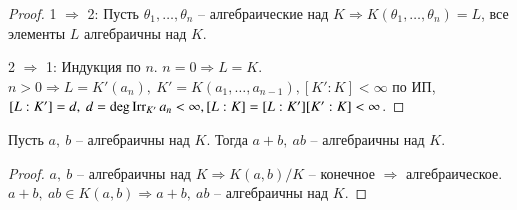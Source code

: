 \documentclass[main]{subfiles}
\begin{document}
\begin{proof}
    1 $\Rightarrow$ 2: Пусть $\theta_1, \ldots, \theta_n$ -- алгебраические над $K \Rightarrow
    K(\theta_1, \ldots, \theta_n) = L$, все элементы $L$ алгебраичны над $K$.

    2 $\Rightarrow$ 1: Индукция по $n$. $n = 0 \Rightarrow L = K$.
    $n > 0 \Rightarrow L = K'(a_n), \ K' = K(a_1, \ldots, a_{n-1}),
    [K':K] < \infty$ по ИП, $[L:K'] = d, \ d = \deg \operatorname{Irr}_{K'}a_n < \infty, 
    [L:K] = [L:K'][K':K] < \infty$.
\end{proof}

\begin{corollary}
    Пусть $a, \ b$  -- алгебраичны над $K$. Тогда $a + b, \ ab$ -- алгебраичны над $K$. 
\end{corollary}
    
\begin{proof}
    $a, \ b$  -- алгебраичны над $K \Rightarrow K(a, b)/K$ -- конечное $\Rightarrow$ алгебраическое.
    $a+b, \ ab \in K(a, b) \Rightarrow a+b, \ ab$ -- алгебраичны над $K$.
\end{proof}
\end{document}
